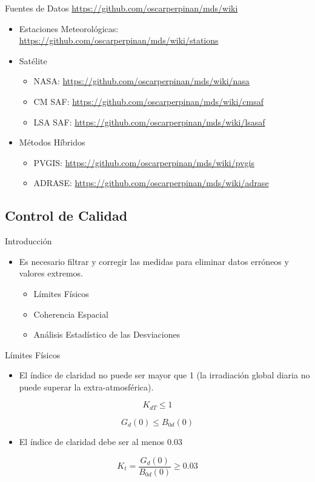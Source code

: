 \documentclass[xcolor={usenames,svgnames,dvipsnames}]{beamer}
\begin{document}
\begin{frame}[label={sec:org7b7dfc3}]{Fuentes de Datos}
\url{https://github.com/oscarperpinan/mds/wiki}

\begin{itemize}
\item Estaciones Meteorológicas: \url{https://github.com/oscarperpinan/mds/wiki/stations}
\item Satélite
\begin{itemize}
\item NASA: \url{https://github.com/oscarperpinan/mds/wiki/nasa}
\item CM SAF: \url{https://github.com/oscarperpinan/mds/wiki/cmsaf}
\item LSA SAF: \url{https://github.com/oscarperpinan/mds/wiki/lsasaf}
\end{itemize}

\item Métodos Híbridos
\begin{itemize}
\item PVGIS: \url{https://github.com/oscarperpinan/mds/wiki/pvgis}
\item ADRASE: \url{https://github.com/oscarperpinan/mds/wiki/adrase}
\end{itemize}
\end{itemize}
\end{frame}

\subsection{Control de Calidad}
\label{sec:org2a7ce75}
\begin{frame}[label={sec:org7ef0930}]{Introducción}
\begin{itemize}
\item Es necesario filtrar y corregir las medidas para eliminar datos erróneos y valores extremos.
\begin{itemize}
\item Límites Físicos
\item Coherencia Espacial
\item Análisis Estadístico de las Desviaciones
\end{itemize}
\end{itemize}
\end{frame}

\begin{frame}[label={sec:org13e8851}]{Límites Físicos}
\begin{itemize}
\item El índice de claridad no puede ser mayor que 1 (la irradiación global diaria no puede superar la extra-atmosférica).
\end{itemize}
\[
  K_{dT} \leq 1
\]

\[
G_d(0) \leq B_{0d}(0)
\]

\begin{itemize}
\item El índice de claridad debe ser al menos 0.03
\end{itemize}
\[
K_t = \frac{G_d(0)}{B_{0d}(0)} \geq 0.03
\]
\end{frame}
\end{document}
